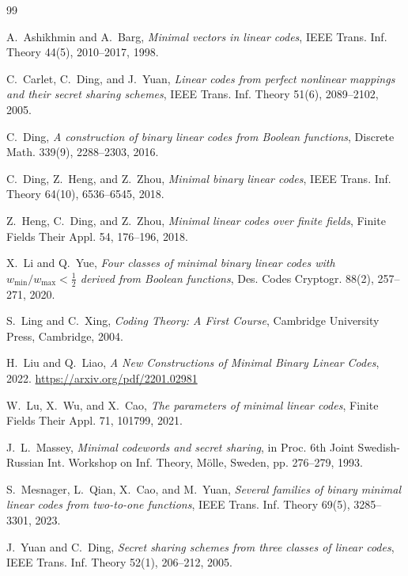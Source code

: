 \documentclass[pdflatex,sn-mathphys-num]{sn-jnl}%
\theoremstyle{thmstyleone}%
\theoremstyle{thmstyletwo}%
\theoremstyle{thmstylethree}%
\begin{document}
\begin{thebibliography}{99}

A.~Ashikhmin and A.~Barg, \textit{Minimal vectors in linear codes}, IEEE Trans. Inf. Theory 44(5), 2010--2017, 1998.

C.~Carlet, C.~Ding, and J.~Yuan, \textit{Linear codes from perfect nonlinear mappings and their secret sharing schemes}, IEEE Trans. Inf. Theory 51(6), 2089--2102, 2005.

C.~Ding, \textit{A construction of binary linear codes from Boolean functions}, Discrete Math. 339(9), 2288--2303, 2016.

C.~Ding, Z.~Heng, and Z.~Zhou, \textit{Minimal binary linear codes}, IEEE Trans. Inf. Theory 64(10), 6536--6545, 2018.

Z.~Heng, C.~Ding, and Z.~Zhou, \textit{Minimal linear codes over finite fields}, Finite Fields Their Appl. 54, 176--196, 2018.

X.~Li and Q.~Yue, \textit{Four classes of minimal binary linear codes with $w_{\min}/w_{\max}<\frac12$ derived from Boolean functions}, Des. Codes Cryptogr. 88(2), 257--271, 2020.

S.~Ling and C.~Xing, \textit{Coding Theory: A First Course}, Cambridge University Press, Cambridge, 2004.

H.~Liu and Q.~Liao, \textit{A New Constructions of Minimal Binary Linear Codes}, 2022. \url{https://arxiv.org/pdf/2201.02981}

W.~Lu, X.~Wu, and X.~Cao, \textit{The parameters of minimal linear codes}, Finite Fields Their Appl. 71, 101799, 2021.

J.~L.~Massey, \textit{Minimal codewords and secret sharing}, in Proc. 6th Joint Swedish-Russian Int. Workshop on Inf. Theory, M\"olle, Sweden, pp. 276--279, 1993.

S.~Mesnager, L.~Qian, X.~Cao, and M.~Yuan, \textit{Several families of binary minimal linear codes from two-to-one functions}, IEEE Trans. Inf. Theory 69(5), 3285--3301, 2023.

J.~Yuan and C.~Ding, \textit{Secret sharing schemes from three classes of linear codes}, IEEE Trans. Inf. Theory 52(1), 206--212, 2005.

\end{thebibliography}
\end{document}
